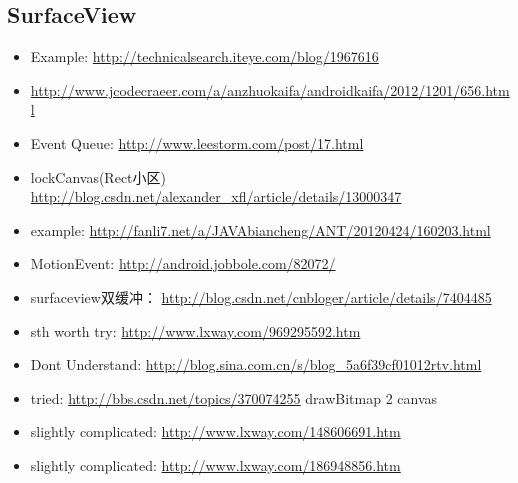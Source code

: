 \documentclass[9pt,b5paper]{article}
\begin{document}
\subsection{SurfaceView}
\label{sec-3-2}
\begin{itemize}
\item Example: \url{http://technicalsearch.iteye.com/blog/1967616}
\item \url{http://www.jcodecraeer.com/a/anzhuokaifa/androidkaifa/2012/1201/656.html}
\item Event Queue: \url{http://www.leestorm.com/post/17.html}
\item lockCanvas(Rect小区) \url{http://blog.csdn.net/alexander_xfl/article/details/13000347}
\item example: \url{http://fanli7.net/a/JAVAbiancheng/ANT/20120424/160203.html}
\item MotionEvent: \url{http://android.jobbole.com/82072/}
\item surfaceview双缓冲： \url{http://blog.csdn.net/cnbloger/article/details/7404485}
\item sth worth try: \url{http://www.lxway.com/969295592.htm}
\item Dont Understand: \url{http://blog.sina.com.cn/s/blog_5a6f39cf01012rtv.html}
\item tried: \url{http://bbs.csdn.net/topics/370074255} drawBitmap 2 canvas
\item slightly complicated: \url{http://www.lxway.com/148606691.htm}
\item slightly complicated: \url{http://www.lxway.com/186948856.htm}
\end{itemize}
\end{document}
